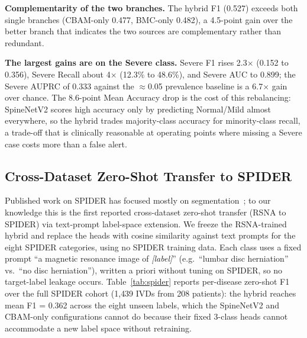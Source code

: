 \documentclass[runningheads]{llncs}
\begin{document}
\textbf{Complementarity of the two branches.} The hybrid F1 (0.527) exceeds both single branches (CBAM-only 0.477, BMC-only 0.482), a 4.5-point gain over the better branch that indicates the two sources are complementary rather than redundant.

\textbf{The largest gains are on the Severe class.} Severe F1 rises 2.3$\times$ (0.152 to 0.356), Severe Recall about 4$\times$ (12.3\% to 48.6\%), and Severe AUC to 0.899; the Severe AUPRC of 0.333 against the $\approx$0.05 prevalence baseline is a 6.7$\times$ gain over chance. The 8.6-point Mean Accuracy drop is the cost of this rebalancing: SpineNetV2 scores high accuracy only by predicting Normal/Mild almost everywhere, so the hybrid trades majority-class accuracy for minority-class recall, a trade-off that is clinically reasonable at operating points where missing a Severe case costs more than a false alert.

\subsection{Cross-Dataset Zero-Shot Transfer to SPIDER}

Published work on SPIDER has focused mostly on segmentation~\cite{vandergraaf2024spider}; to our knowledge this is the first reported cross-dataset zero-shot transfer (RSNA to SPIDER) via text-prompt label-space extension. We freeze the RSNA-trained hybrid and replace the heads with cosine similarity against text prompts for the eight SPIDER categories, using no SPIDER training data. Each class uses a fixed prompt ``a magnetic resonance image of \emph{[label]}'' (e.g.\ ``lumbar disc herniation'' vs.\ ``no disc herniation''), written a priori without tuning on SPIDER, so no target-label leakage occurs. Table~\ref{tab:spider} reports per-disease zero-shot F1 over the full SPIDER cohort (1{,}439 IVDs from 208 patients): the hybrid reaches mean F1 = 0.362 across the eight unseen labels, which the SpineNetV2 and CBAM-only configurations cannot do because their fixed 3-class heads cannot accommodate a new label space without retraining.
\end{document}
